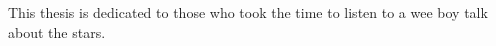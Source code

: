 \begin{dedication} %

This thesis is dedicated to those who took the time to listen to a wee boy talk about the stars.

\end{dedication}

